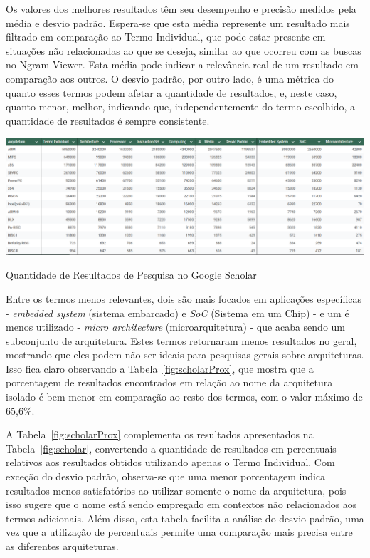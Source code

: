 \documentclass[
	article,			%
	11pt,				%
	oneside,			%
	a4paper,			%
	english,			%
	brazil,				%
	sumario=tradicional
	]{abntex2}
\begin{document}
Os valores dos melhores resultados têm seu desempenho e precisão medidos pela média e desvio padrão. Espera-se que esta média represente um resultado mais filtrado em comparação ao Termo Individual, que pode estar presente em situações não relacionadas ao que se deseja, similar ao que ocorreu com as buscas no Ngram Viewer. Esta média pode indicar a relevância real de um resultado em comparação aos outros. O desvio padrão, por outro lado, é uma métrica do quanto esses termos podem afetar a quantidade de resultados, e, neste caso, quanto menor, melhor, indicando que, independentemente do termo escolhido, a quantidade de resultados é sempre consistente.

\begin{table}[h]
    \centering
    \includegraphics[width=1\linewidth]{BaseDeDados/scholar.png}
    \caption{Quantidade de Resultados de Pesquisa no Google Scholar}
    \label{fig:scholar}
\end{table}

Entre os termos menos relevantes, dois são mais focados em aplicações específicas - \textit{embedded system} (sistema embarcado) e \textit{SoC} (Sistema em um Chip) - e um é menos utilizado - \textit{micro architecture} (microarquitetura) - que acaba sendo um subconjunto de arquitetura. Estes termos retornaram menos resultados no geral, mostrando que eles podem não ser ideais para pesquisas gerais sobre arquiteturas. Isso fica claro observando a Tabela~\ref{fig:scholarProx}, que mostra que a porcentagem de resultados encontrados em relação ao nome da arquitetura isolado é bem menor em comparação ao resto dos termos, com o valor máximo de 65,6\%.

A Tabela~\ref{fig:scholarProx} complementa os resultados apresentados na Tabela~\ref{fig:scholar}, convertendo a quantidade de resultados em percentuais relativos aos resultados obtidos utilizando apenas o Termo Individual. Com exceção do desvio padrão, observa-se que uma menor porcentagem indica resultados menos satisfatórios ao utilizar somente o nome da arquitetura, pois isso sugere que o nome está sendo empregado em contextos não relacionados aos termos adicionais. Além disso, esta tabela facilita a análise do desvio padrão, uma vez que a utilização de percentuais permite uma comparação mais precisa entre as diferentes arquiteturas.
\end{document}
